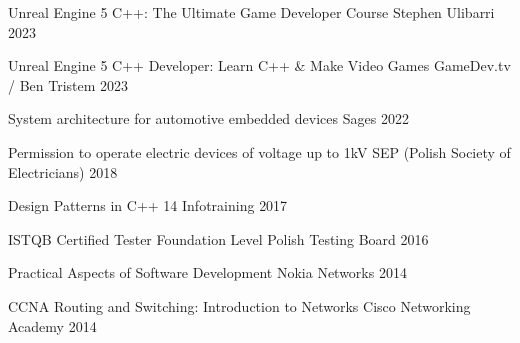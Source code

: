 

\begin{cvhonors}

  \cvhonor
    {Unreal Engine 5 C++: The Ultimate Game Developer Course} %
    {Stephen Ulibarri} %
    {} %
    {2023} %

  \cvhonor
    {Unreal Engine 5 C++ Developer: Learn C++ \& Make Video Games} %
    {GameDev.tv / Ben Tristem} %
    {} %
    {2023} %

  \cvhonor
    {System architecture for automotive embedded devices} %
    {Sages} %
    {} %
    {2022} %

\ifdefined\fullcv
    
      \cvhonor
        {Permission to operate electric devices of voltage up to 1kV} %
        {SEP (Polish Society of Electricians)} %
        {} %
        {2018} %
    
      \cvhonor
        {Design Patterns in C++ 14} %
        {Infotraining} %
        {} %
        {2017} %
    
      \cvhonor
        {ISTQB Certified Tester Foundation Level} %
        {Polish Testing Board} %
        {} %
        {2016} %
    
      \cvhonor
        {Practical Aspects of Software Development} %
        {Nokia Networks} %
        {} %
        {2014} %
    
      \cvhonor
        {CCNA Routing and Switching: Introduction to Networks} %
        {Cisco Networking Academy} %
        {} %
        {2014} %

\else
\fi

\end{cvhonors}
